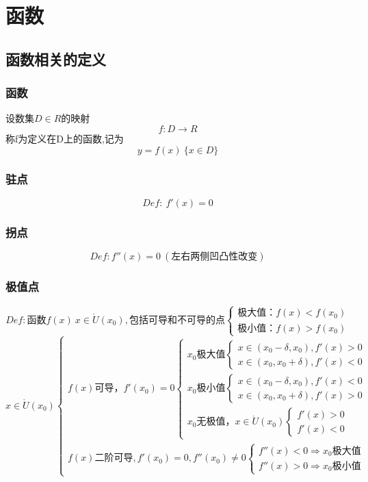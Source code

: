 \section{函数}\label{zhang_function}
\subsection{函数相关的定义}
\subsubsection{函数}
设数集$D\in R$的映射
$$f: D\rightarrow R$$
称f为定义在D上的函数,记为
$$y = f(x)\ \{x\in D\}$$
\subsubsection{驻点}
$$Def:\ f'(x)=0$$
\subsubsection{拐点}
$$Def:f''(x)=0\ (\mbox{左右两侧凹凸性改变})$$
\subsubsection{极值点}
$$Def:\mbox{函数}f(x)\ x\in \mathring{U}(x_0),\mbox{包括可导和不可导的点} \begin{cases}
    \mbox{极大值：}f(x)<f(x_0)\\
    \mbox{极小值：}f(x)>f(x_0)
\end{cases}$$
$$x\in \mathring{U}(x_0)\begin{cases}
    f(x)\mbox{可导，}f'(x_0)=0\begin{cases}x_0\mbox{极大值}
        \begin{cases}
            x\in (x_0-\delta ,x_0),f'(x)>0\\
            x\in (x_0 ,x_0+\delta),f'(x)<0
        \end{cases}\\
    x_0\mbox{极小值}\begin{cases}
        x\in (x_0-\delta ,x_0),f'(x)<0\\
        x\in (x_0 ,x_0+\delta),f'(x)>0
        \end{cases}\\
        x_0\mbox{无极值，}x\in \mathring{U}(x_0)\begin{cases}
            f'(x)>0\\
            f'(x)<0
        \end{cases}
    \end{cases}\\
    f(x)\mbox{二阶可导},f'(x_0)=0,f''(x_0)\neq0
    \begin{cases}f''(x)<0\Rightarrow x_0\mbox{极大值}\\
        f''(x)>0\Rightarrow x_0\mbox{极小值}
    \end{cases}
\end{cases}$$
